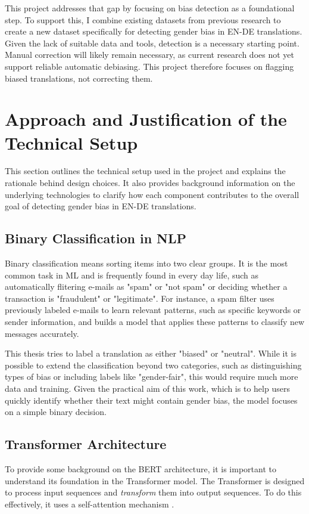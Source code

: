    This project addresses that gap by focusing on bias detection as a foundational step. To support this, I combine existing datasets from previous research to create a new dataset specifically for detecting gender bias in EN-DE translations. Given the lack of suitable data and tools, detection is a necessary starting point. Manual correction will likely remain necessary, as current research does not yet support reliable automatic debiasing. This project therefore focuses on flagging biased translations, not correcting them.


\section{Approach and Justification of the Technical Setup}
    This section outlines the technical setup used in the project and explains the rationale behind design choices. It also provides background information on the underlying technologies to clarify how each component contributes to the overall goal of detecting gender bias in EN-DE translations.

\subsection{Binary Classification in NLP}
    Binary classification means sorting items into two clear groups. It is the most common task in ML and is frequently found in every day life, such as automatically flitering e-mails as "spam" or "not spam" \parencite{quemyBinaryClassificationUnstructured2019} or deciding whether a transaction is "fraudulent" or "legitimate". For instance, a spam filter uses previously labeled e-mails to learn relevant patterns, such as specific keywords or sender information, and builds a model that applies these patterns to classify new messages accurately. 
    
    This thesis tries to label a translation as either "biased" or "neutral". While it is possible to extend the classification beyond two categories, such as distinguishing types of bias or including labels like "gender-fair", this would require much more data and training. Given the practical aim of this work, which is to help users quickly identify whether their text might contain gender bias, the model focuses on a simple binary decision.

\subsection{Transformer Architecture} \label{subsection:transformer_arch}
  To provide some background on the BERT architecture, it is important to understand its foundation in the Transformer model. The Transformer is designed to process input sequences and \textit{transform} them into output sequences. To do this effectively, it uses a self-attention mechanism \parencite{phuongFormalAlgorithmsTransformers2022}.

